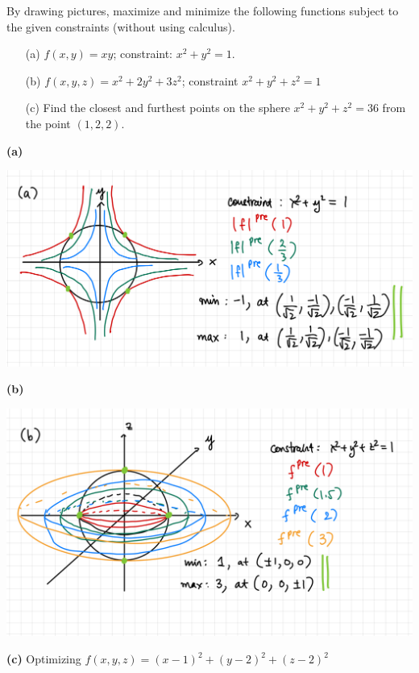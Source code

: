 \documentclass[a4paper, 12pt]{article}
\begin{document}
\begin{problem} 
By drawing pictures, maximize and minimize the following functions subject to the given constraints (without using calculus).
\begin{itemize}
    \item[(a)] $f(x,y) = xy$; constraint: $x^2+y^2 = 1$.
    \item[(b)] $f(x,y,z) = x^2 + 2y^2 + 3z^2$; constraint $x^2+y^2+z^2 = 1$
    \item[(c)] Find the closest and furthest points on the sphere $x^2+y^2+z^2 = 36$ from the point $(1,2,2)$.
\end{itemize}
\end{problem}
\begin{solution}
    \textbf{(a)}
    \begin{center}
        \includegraphics[width=16cm]{./figures/7.5a.jpeg}
    \end{center}
    \textbf{(b)}
    \begin{center}
        \includegraphics[width=16cm]{./figures/7.5b.jpeg}
    \end{center}
    \textbf{(c)} Optimizing $f(x, y, z) = (x-1)^2 + (y-2)^2 + (z-2)^2$
    \begin{center}

\end{center}
\end{solution}
\end{document}
